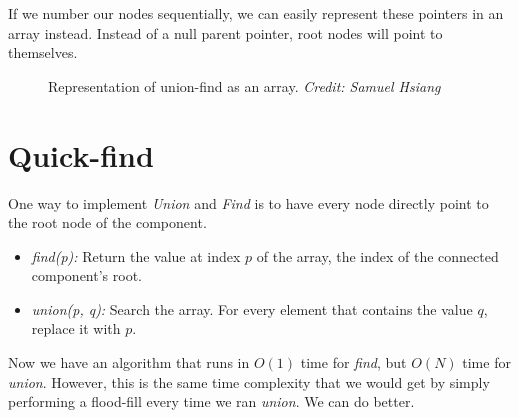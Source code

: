 \documentclass{article}
\begin{document}
If we number our nodes sequentially, we can easily represent these pointers in an array instead. Instead of a null parent pointer, root nodes will point to themselves.

\begin{figure}[h]
\centering
{
}
\caption{Representation of union-find as an array. \textit{Credit: Samuel Hsiang}}
\end{figure}

\section{Quick-find}
One way to implement \textit{Union} and \textit{Find} is to have every node directly point to the root node of the component.

\begin{itemize}
    \item \textit{find(p):} Return the value at index $p$ of the array, the index of the connected component's root.
    \item \textit{union(p, q):} Search the array. For every element that contains the value $q$, replace it with $p$.
\end{itemize}

Now we have an algorithm that runs in $O(1)$ time for \textit{find}, but $O(N)$ time for \textit{union}. However, this is the same time complexity that we would get by simply performing a flood-fill every time we ran \textit{union}. We can do better.
\end{document}
